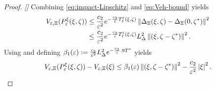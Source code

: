 \begin{proof}{\em []}
  Combining \eqref{eq:impact-Lipschitz} and \eqref{eq:Veh-bound} yields
  \begin{align*}
    V_{\varepsilon, \Xi}(P_{\varepsilon}^{\xi}(\xi, \zeta)) &\leq \frac{c_{2}}{\varepsilon^{2}}
    e^{-\frac{c_{3}}{\varepsilon} T_{I}^{\varepsilon}(\xi, \zeta)} \left\| \Delta_{\Xi}(\xi, \zeta) -
      \Delta_{\Xi}(0, \zeta^{*}) \right\|^{2}\\
    &\leq \frac{c_{2}}{\varepsilon^{2}} e^{-\frac{c_{3}}{\varepsilon}
      T_{I}^{\varepsilon}(\xi, \zeta)} L_{\Delta}^{2} \left\|(\xi, \zeta - \zeta^{*})\right\|^{2}.
  \end{align*}
  Using  and defining $\beta_{1}(\varepsilon) :=
  \frac{c_{2}}{\varepsilon^{2}} L_{\Delta}^{2} e^{-\frac{c_{3}}{\varepsilon} .9
    T^{*}}$ yields
  \begin{align}
    \label{eq:DVeX-bounds}
    V_{\varepsilon, \Xi}(P_{\varepsilon}^{\xi}(\xi, \zeta)) - V_{\varepsilon, \Xi}(\xi) \leq \beta_{1}(\varepsilon) \left\|(\xi, \zeta - \zeta^{*})\right\|^{2} -
    \frac{c_{2}}{\varepsilon^{2}} \left|\xi\right|^{2}.
  \end{align}


\end{proof}
